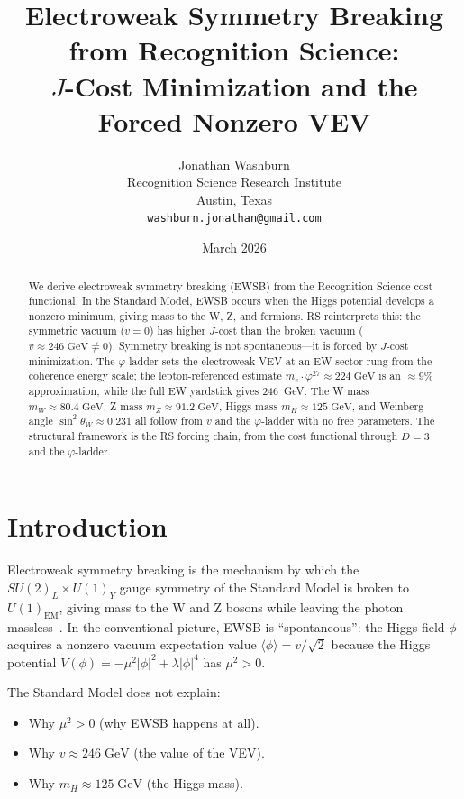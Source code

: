 \documentclass[12pt,a4paper]{article}
\title{Electroweak Symmetry Breaking from Recognition Science:\\
$J$-Cost Minimization and the Forced Nonzero VEV}
\author{Jonathan Washburn\\
Recognition Science Research Institute\\
Austin, Texas\\
\texttt{washburn.jonathan@gmail.com}}
\date{March 2026}
\theoremstyle{definition}
\theoremstyle{remark}
\begin{document}
\maketitle

\begin{abstract}
We derive electroweak symmetry breaking (EWSB) from the
Recognition Science cost functional.  In the Standard Model,
EWSB occurs when the Higgs potential develops a nonzero
minimum, giving mass to the W, Z, and fermions.  RS reinterprets
this: the symmetric vacuum ($v = 0$) has higher $J$-cost than
the broken vacuum ($v \approx 246\;
\mathrm{GeV} \neq 0$).  Symmetry breaking is not
spontaneous---it is forced by $J$-cost minimization.  The
$\varphi$-ladder sets the electroweak VEV at an EW sector rung
from the coherence energy scale; the lepton-referenced estimate
$m_e \cdot \varphi^{27} \approx 224\;\mathrm{GeV}$ is an
$\approx 9\%$ approximation, while the full EW yardstick gives 246~GeV.
The W mass
$m_W \approx 80.4\;\mathrm{GeV}$, Z mass
$m_Z \approx 91.2\;\mathrm{GeV}$, Higgs mass
$m_H \approx 125\;\mathrm{GeV}$, and Weinberg angle
$\sin^2\theta_W \approx 0.231$ all follow from $v$ and the
$\varphi$-ladder with no free parameters.  The structural framework is the RS forcing chain, from the
cost functional through $D = 3$ and the $\varphi$-ladder.
\end{abstract}

\section{Introduction}
\label{sec:intro}

Electroweak symmetry breaking is the mechanism by which the
$SU(2)_L \times U(1)_Y$ gauge symmetry of the Standard Model
is broken to $U(1)_{\mathrm{EM}}$, giving mass to the W and Z
bosons while leaving the photon massless~\cite{Higgs1964,
Englert1964}.  In the conventional picture, EWSB is ``spontaneous'':
the Higgs field $\phi$ acquires a nonzero vacuum expectation value
$\langle\phi\rangle = v/\sqrt{2}$ because the Higgs potential
$V(\phi) = -\mu^2|\phi|^2 + \lambda|\phi|^4$ has $\mu^2 > 0$.

The Standard Model does not explain:
\begin{itemize}
  \item Why $\mu^2 > 0$ (why EWSB happens at all).
  \item Why $v \approx 246\;\mathrm{GeV}$ (the value of the VEV).
  \item Why $m_H \approx 125\;\mathrm{GeV}$ (the Higgs mass).
\end{itemize}
\end{document}
